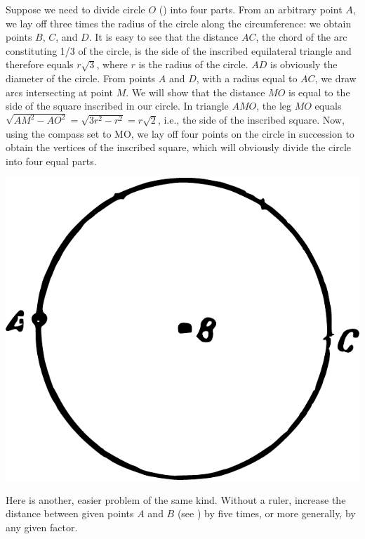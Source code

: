 \ans Suppose we need to divide circle $O$ () into four parts. From an arbitrary point $A$, we lay off three times the radius of the circle along the circumference: we obtain points $B$, $C$, and $D$. It is easy to see that the distance $AC$, the chord of the arc constituting 1/3 of the circle, is the side of the inscribed equilateral triangle and therefore equals \( r \sqrt{3} \), where \( r \) is the radius of the circle. $AD$ is obviously the diameter of the circle. From points $A$ and $D$, with a radius equal to $AC$, we draw arcs intersecting at point $M$. We will show that the distance $MO$ is equal to the side of the square inscribed in our circle. In triangle $AMO$, the leg $MO$ equals \( \sqrt{AM^{2} - AO^{2}} = \sqrt{3r^{2} - r^{2}} = r\sqrt{2} \), i.e., the side of the inscribed square. Now, using the compass set to MO, we lay off four points on the circle in succession to obtain the vertices of the inscribed square, which will obviously divide the circle into four equal parts.
\begin{marginfigure}[-2.5cm]%
\centering
\includegraphics[width=\textwidth]{figures/ch-10/fig-146.pdf}
\end{marginfigure}

\ques Here is another, easier problem of the same kind. Without a ruler, increase the distance between given points $A$ and $B$ (see ) by five times, or more generally, by any given factor.



